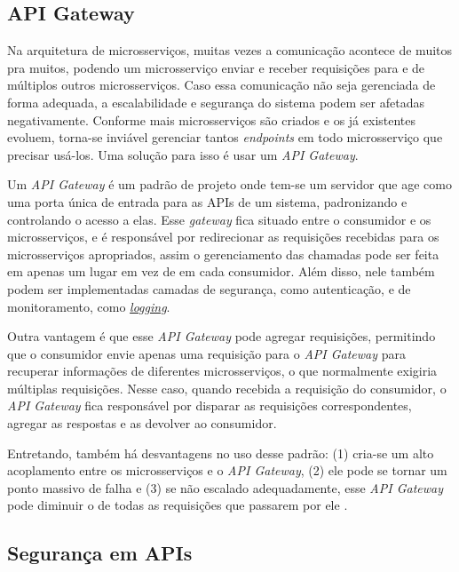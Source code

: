 \subsection{API Gateway}\label{boas-praticas-api-gateway}
Na arquitetura de microsserviços, muitas vezes a comunicação acontece de muitos pra muitos, podendo um microsserviço enviar e receber requisições para e de múltiplos outros microsserviços. Caso essa comunicação não seja gerenciada de forma adequada, a escalabilidade e segurança do sistema podem ser afetadas negativamente. Conforme mais microsserviços são criados e os já existentes evoluem, torna-se inviável gerenciar tantos \emph{endpoints} em todo microsserviço que precisar usá-los. Uma solução para isso é usar um \emph{API Gateway}. \cite{livro-building-microservices}

Um \emph{API Gateway} é um padrão de projeto onde tem-se um servidor que age como uma porta única de entrada para as APIs de um sistema, padronizando e controlando o acesso a elas. Esse \emph{gateway} fica situado entre o consumidor e os microsserviços, e é responsável por redirecionar as requisições recebidas para os microsserviços apropriados, assim o gerenciamento das chamadas pode ser feita em apenas um lugar em vez de em cada consumidor. Além disso, nele também podem ser implementadas camadas de segurança, como autenticação, e de monitoramento, como \hyperref[subsecao-registros]{\emph{logging}}.

Outra vantagem é que esse \emph{API Gateway} pode agregar requisições, permitindo que o consumidor envie apenas uma requisição para o \emph{API Gateway} para recuperar informações de diferentes microsserviços, o que normalmente exigiria múltiplas requisições. Nesse caso, quando recebida a requisição do consumidor, o \emph{API Gateway} fica responsável por disparar as requisições correspondentes, agregar as respostas e as devolver ao consumidor.

Entretando, também há desvantagens no uso desse padrão: (1) cria-se um alto acoplamento entre os microsserviços e o \emph{API Gateway}, (2) ele pode se tornar um ponto massivo de falha e (3) se não escalado adequadamente, esse \emph{API Gateway} pode diminuir o de todas as requisições que passarem por ele \cite{microsoft-api-gateway}.

\subsection{Segurança em APIs}

